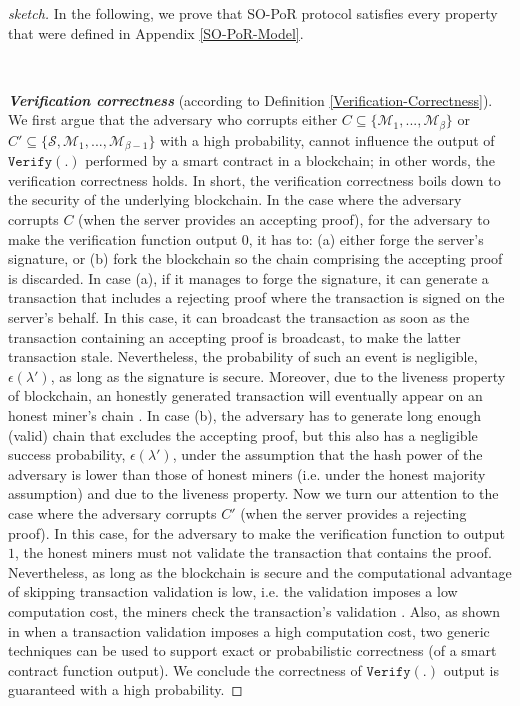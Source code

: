 \begin{proof}[sketch]  In the following, we prove that SO-PoR protocol satisfies every  property that were defined in Appendix \ref{SO-PoR-Model}.   

\

\noindent\textbf{\textit{Verification correctness}} (according to Definition \ref{Verification-Correctness}). We first argue that the adversary who corrupts either $C\subseteq\{\mathcal{M}_{\scriptscriptstyle 1},...,\mathcal{M}_{\scriptscriptstyle\beta}\}$ or $C'\subseteq\{\mathcal{S},\mathcal{M}_{\scriptscriptstyle 1},...,\mathcal{M}_{\scriptscriptstyle\beta-1}\}$ with a high probability, cannot influence the output of $\mathtt{Verify}(.)$ performed by a smart contract in a blockchain; in other words, the verification correctness holds. In short, the verification correctness boils down to the security of the underlying blockchain. In the case where the adversary corrupts $C$ (when the server provides an accepting proof),  for the adversary to make the verification function output $0$, it has to: (a) either forge the server's signature, or (b)  fork the blockchain so the chain  comprising the accepting proof is discarded. In case (a),  if it manages to forge the signature, it can generate a transaction that includes   a rejecting proof where the transaction is signed on the server's behalf. In this case, it  can broadcast the transaction as soon as the transaction containing an accepting proof is broadcast,  to make the latter transaction stale. Nevertheless, the probability of such  an event is negligible, $\epsilon(\lambda')$, as long as the signature is secure. Moreover, due to the liveness property of blockchain, an honestly generated transaction will eventually appear on an honest miner's chain \cite{DBLP:conf/crypto/GarayKL17}. In case (b),  the adversary has to generate long enough (valid) chain that excludes the accepting proof, but this also has a negligible success probability, $\epsilon(\lambda')$, under the assumption that the hash power of the adversary is lower than those of  honest miners (i.e. under the honest majority assumption) and due to the liveness property. Now we turn our attention to the case where the adversary corrupts $C'$ (when the server provides a rejecting proof). In this case, for the adversary to make the verification function to output $1$, the honest miners must not validate the transaction that contains the proof. Nevertheless, as long as the blockchain is secure and  the computational advantage of skipping transaction validation is low, i.e. the validation imposes a low computation cost, the miners check   the transaction's validation \cite{LuuTKS15}. Also, as shown in \cite{LuuTKS15} when a transaction validation imposes a high computation cost, two generic techniques can be used to support exact or probabilistic correctness (of a smart contract function output). We conclude the correctness of $\mathtt{Verify}(.)$ output  is guaranteed with a high probability.


\end{proof}

